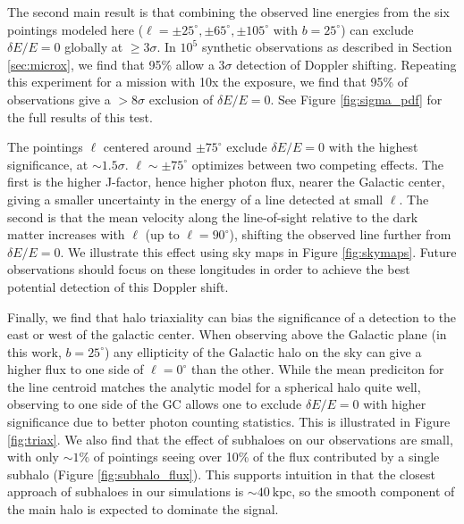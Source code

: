 \documentclass[aps,prd,10pt,twocolumn,superscriptaddress,showpacs]{revtex4-1}
\newcommand{\units}[1]{~\mathrm{#1}}
\begin{document}
The second main result is that combining the observed line energies from the six pointings modeled
here ($\ell=\pm25^\circ,\pm65^\circ,\pm105^\circ$ with $b=25^\circ$) can exclude
$\delta E/E = 0$ globally at $\geq 3\sigma$. In $10^5$ synthetic observations as described in
Section \ref{sec:microx}, we find that 95\% allow a $3\sigma$ detection of Doppler shifting. Repeating this
experiment for a mission with 10x the exposure, we find that 95\% of observations give a $>8\sigma$
exclusion of $\delta E/E = 0$. See Figure \ref{fig:sigma_pdf} for the full results of this test.

The pointings $\ell$ centered around $\pm75^\circ$ exclude $\delta E/E=0$ with 
the highest significance, at $\sim 1.5\sigma$. $\ell\sim\pm75^\circ$ optimizes between two
competing effects. The first is the higher J-factor, hence higher
photon flux, nearer the Galactic center, giving a smaller uncertainty in the energy of a line
detected at small $\ell$. The second is that the mean velocity along the line-of-sight relative to
the dark matter increases with $\ell$ (up to $\ell=90^\circ$), shifting the observed line further
from $\delta E/E=0$. We illustrate this effect using sky maps in Figure \ref{fig:skymaps}.
Future observations should focus on these longitudes
in order to achieve the best potential detection of this Doppler shift.

Finally, we find that halo triaxiality can bias the significance of a detection to
the east or west of the galactic center. When observing above the Galactic plane (in this work,
$b=25^\circ$) any ellipticity of the Galactic halo on the sky can give a higher flux to one side of
$\ell=0^\circ$ than the other. While the mean prediciton for the line centroid matches the analytic model
for a spherical halo quite well, observing to one side of the GC allows one to exclude $\delta
E/E=0$ with higher significance due to better photon counting statistics. This is illustrated in
Figure \ref{fig:triax}. We also find that the effect of subhaloes on our observations are small,
with only $\sim1\%$ of pointings seeing over 10\% of the flux contributed by a single subhalo
(Figure \ref{fig:subhalo_flux}). This supports intuition in that the closest approach of subhaloes in our
simulations is $\sim40\units{kpc}$, so the smooth component of the main halo is expected to dominate
the signal.

\end{document}
